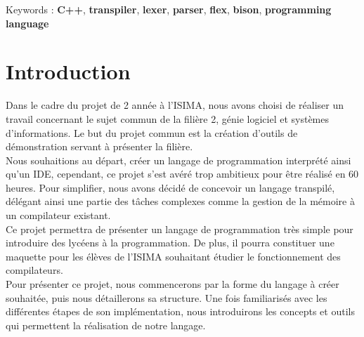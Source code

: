 \documentclass[a4paper]{article}%
\begin{document}
\noindent
Keywords : \textbf{C++}, \textbf{transpiler}, \textbf{lexer}, \textbf{parser},
\textbf{flex}, \textbf{bison}, \textbf{programming language}

\clearpage{}

\pagestyle{plain}
\setcounter{page}{1}
\clearpage
\section*{Introduction}
\large
Dans le cadre du projet de 2 année à l'ISIMA, nous avons choisi de
réaliser un travail concernant le sujet commun de la filière 2, génie logiciel
et systèmes d'informations. Le but du projet commun est la création d'outils de
démonstration servant à présenter la filière.\\

Nous souhaitions au départ, créer un langage de programmation interprété ainsi
qu'un IDE, cependant, ce projet s'est avéré trop ambitieux pour être réalisé en
60 heures. Pour simplifier, nous avons décidé de concevoir un langage transpilé,
délégant ainsi une partie des tâches complexes comme la gestion de la mémoire à
un compilateur existant.\\

Ce projet permettra de présenter un langage de programmation très simple pour
introduire des lycéens à la programmation. De plus, il pourra constituer une
maquette pour les élèves de l'ISIMA souhaitant étudier le fonctionnement des
compilateurs.\\

Pour présenter ce projet, nous commencerons par la forme du langage à créer
souhaitée, puis nous détaillerons sa structure. Une fois familiarisés avec les
différentes étapes de son implémentation,  nous introduirons les concepts et
outils qui permettent la réalisation de notre langage.\\

\normalsize
\clearpage{}


\end{document}
